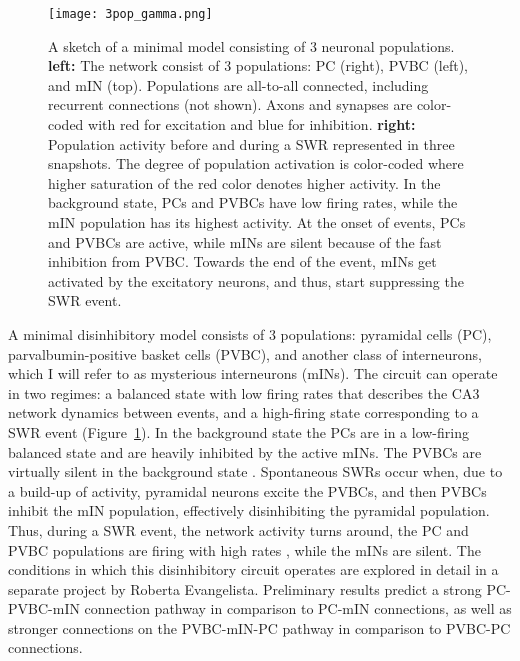     \begin{figure}
      \center
      \texttt{[image: 3pop\_gamma.png]}
      \caption{
        A sketch of a minimal model consisting of 3 neuronal populations.
        \textbf{left:} The network consist of 3 populations: PC
        (right), PVBC (left), and mIN (top). Populations are all-to-all
        connected, including recurrent connections (not shown). Axons and
        synapses are color-coded with red for excitation and blue for
        inhibition.
        \textbf{right:} Population activity before and during a SWR represented
        in three snapshots. The degree of population activation is color-coded
        where higher saturation of the red color denotes higher activity. In
        the background state, PCs and PVBCs have low firing rates, while the
        mIN population has its highest activity. At the onset of events, PCs
        and PVBCs are active, while mINs are silent because of the fast
        inhibition from PVBC. Towards the end of the event, mINs get activated
        by the excitatory neurons, and thus, start suppressing the SWR event.
             }
      \label{fig:3pop}
    \end{figure}
    
    A minimal disinhibitory model consists of 3 populations: pyramidal cells
    (PC), parvalbumin-positive basket cells (PVBC), and another class of
    interneurons, which I will refer to as mysterious interneurons (mINs). The
    circuit can operate in two regimes: a balanced state with low firing rates
    that describes the CA3 network dynamics between events, and a high-firing
    state corresponding to a SWR event (Figure~\ref{fig:3pop}). In the
    background state the PCs are in a low-firing \citep{Csicsvari1999} balanced
    state and are heavily inhibited by the active mINs. The PVBCs are virtually
    silent in the background state \citep{Klausberger2003, Varga2012}.
    Spontaneous SWRs occur when, due to a build-up of activity, pyramidal
    neurons excite the PVBCs, and then PVBCs inhibit the mIN population,
    effectively disinhibiting the pyramidal population. Thus, during a SWR
    event, the network activity turns around, the PC and PVBC populations are
    firing with high rates \citep{Klausberger2003, Varga2012}, while the mINs
    are silent. The conditions in which this disinhibitory circuit operates are
    explored in detail in a separate project by Roberta Evangelista.
    Preliminary results predict a strong PC-PVBC-mIN connection pathway in
    comparison to PC-mIN connections, as well as stronger connections on the
    PVBC-mIN-PC pathway in comparison to PVBC-PC connections.
    
